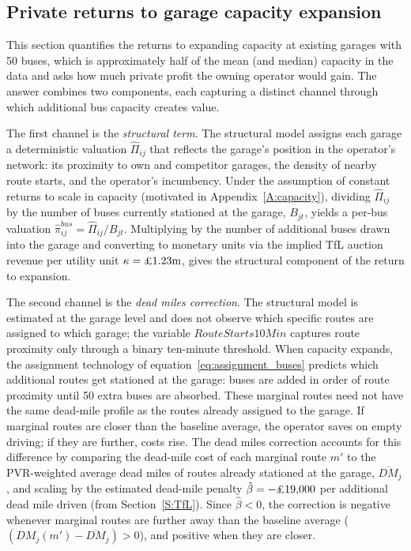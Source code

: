 \documentclass[12pt]{article}
\begin{document}
\subsection{Private returns to garage capacity expansion}\label{SS:UP1}
\label{SS:urbanpolicy1}
This section quantifies the returns to expanding capacity at existing garages with 50 buses, which is approximately half of the mean (and median) capacity in the data and asks how much private profit the
owning operator would gain. The answer combines two components, each capturing
a distinct channel through which additional bus capacity creates value. 

The first channel is the \emph{structural term}. The structural model assigns
each garage a deterministic valuation $\hat{\Pi}_{ij}$ that reflects the
garage's position in the operator's network: its proximity to own and
competitor garages, the density of nearby route starts, and the operator's
incumbency. Under the assumption of constant returns to scale in capacity
(motivated in Appendix~\ref{A:capacity}), dividing $\hat{\Pi}_{ij}$ by the
number of buses currently stationed at the garage, $B_{jt}$, yields a
per-bus valuation $\hat{\pi}_{ij}^{bus} = \hat{\Pi}_{ij}/B_{jt}$. Multiplying
by the number of additional buses drawn into the garage and converting to
monetary units via the implied TfL auction revenue per utility unit
$\kappa = \text{\textsterling}1.23\text{m}$, gives the structural component of
the return to expansion.

The second channel is the \emph{dead miles correction}. The structural model
is estimated at the garage level and does not observe which specific routes are
assigned to which garage; the variable $\mathit{RouteStarts10Min}$ captures
route proximity only through a binary ten-minute threshold. When capacity
expands, the assignment technology of equation~\eqref{eq:assignment_buses}
predicts which additional routes get stationed at the garage: buses are added
in order of route proximity until 50 extra buses are absorbed. These marginal
routes need not have the same dead-mile profile as the routes already assigned
to the garage. If marginal routes are closer than the baseline average, the
operator saves on empty driving; if they are further, costs rise. The
dead miles correction accounts for this difference by comparing the
dead-mile cost of each marginal route $m'$ to the PVR-weighted average dead
miles of routes already stationed at the garage, $\overline{DM}_j$, and
scaling by the estimated dead-mile penalty
$\hat{\beta} = -\text{\textsterling}19{,}000$ per additional dead mile driven
(from Section~\ref{S:TfL}). Since $\hat\beta < 0$, the correction is negative
whenever marginal routes are further away than the baseline average
($(DM_j(m') - \overline{DM}_j) > 0$), and positive when they are closer.
\end{document}
